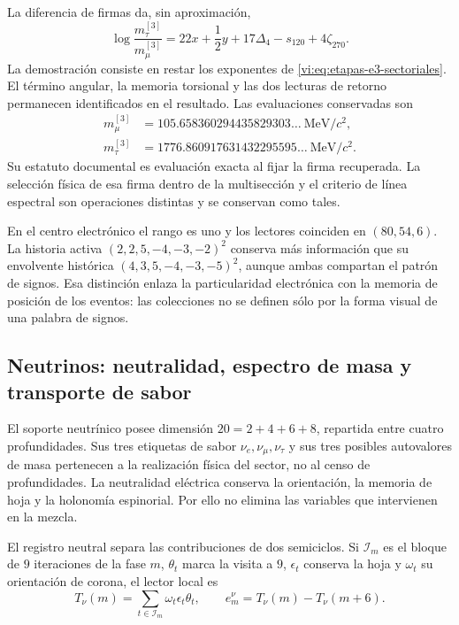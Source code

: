 La diferencia de firmas da, sin aproximación,
\begin{equation}
 \log\frac{m_\tau^{[3]}}{m_\mu^{[3]}}
 =22x+\frac12y+17\Delta_4-s_{120}+4\zeta_{270}.
 \label{vi:eq:razon-tau-muon}
\end{equation}
La demostración consiste en restar los exponentes de
\eqref{vi:eq:etapas-e3-sectoriales}. El término angular, la memoria
torsional y las dos lecturas de retorno permanecen identificados en el
resultado. Las evaluaciones conservadas son
\begin{align*}
 m_\mu^{[3]}&=105.658360294435829303\ldots\ \mathrm{MeV}/c^2,\\
 m_\tau^{[3]}&=1776.860917631432295595\ldots\ \mathrm{MeV}/c^2.
\end{align*}
Su estatuto documental es evaluación exacta al fijar la firma recuperada.
La selección física de esa firma dentro de la multisección y el criterio
de línea espectral son operaciones distintas y se conservan como tales.

En el centro electrónico el rango es uno y los lectores coinciden en
\((80,54,6)\). La historia activa
\((2,2,5,-4,-3,-2)^2\) conserva más información que su envolvente
histórica \((4,3,5,-4,-3,-5)^2\), aunque ambas compartan el patrón de
signos. Esa distinción enlaza la particularidad electrónica con la
memoria de posición de los eventos: las colecciones no se definen sólo por
la forma visual de una palabra de signos.

\subsection{Neutrinos: neutralidad, espectro de masa y transporte de sabor}
\label{vi:subsec:neutrinos-familias}

El soporte neutrínico posee dimensión \(20=2+4+6+8\), repartida entre
cuatro profundidades. Sus tres etiquetas de sabor
\(\nu_e,\nu_\mu,\nu_\tau\) y sus tres posibles autovalores de masa
pertenecen a la realización física del sector, no al censo de
profundidades. La neutralidad eléctrica conserva la orientación, la
memoria de hoja y la holonomía espinorial. Por ello no elimina las
variables que intervienen en la mezcla.

El registro neutral separa las contribuciones de dos semiciclos. Si
\(\mathcal I_m\) es el bloque de \(9\) iteraciones de la fase \(m\),
\(\theta_t\) marca la visita a \(9\), \(\epsilon_t\) conserva la hoja
y \(\omega_t\) su orientación de corona, el lector local es
\[
 T_\nu(m)=\sum_{t\in\mathcal I_m}\omega_t\epsilon_t\theta_t,
 \qquad e_m^\nu=T_\nu(m)-T_\nu(m+6).
\]


